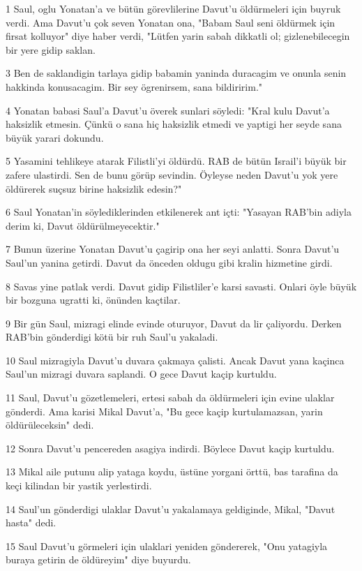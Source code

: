 \par 1 Saul, oglu Yonatan'a ve bütün görevlilerine Davut'u öldürmeleri için buyruk verdi. Ama Davut'u çok seven Yonatan ona, "Babam Saul seni öldürmek için firsat kolluyor" diye haber verdi, "Lütfen yarin sabah dikkatli ol; gizlenebilecegin bir yere gidip saklan.
\par 3 Ben de saklandigin tarlaya gidip babamin yaninda duracagim ve onunla senin hakkinda konusacagim. Bir sey ögrenirsem, sana bildiririm."
\par 4 Yonatan babasi Saul'a Davut'u överek sunlari söyledi: "Kral kulu Davut'a haksizlik etmesin. Çünkü o sana hiç haksizlik etmedi ve yaptigi her seyde sana büyük yarari dokundu.
\par 5 Yasamini tehlikeye atarak Filistli'yi öldürdü. RAB de bütün Israil'i büyük bir zafere ulastirdi. Sen de bunu görüp sevindin. Öyleyse neden Davut'u yok yere öldürerek suçsuz birine haksizlik edesin?"
\par 6 Saul Yonatan'in söylediklerinden etkilenerek ant içti: "Yasayan RAB'bin adiyla derim ki, Davut öldürülmeyecektir."
\par 7 Bunun üzerine Yonatan Davut'u çagirip ona her seyi anlatti. Sonra Davut'u Saul'un yanina getirdi. Davut da önceden oldugu gibi kralin hizmetine girdi.
\par 8 Savas yine patlak verdi. Davut gidip Filistliler'e karsi savasti. Onlari öyle büyük bir bozguna ugratti ki, önünden kaçtilar.
\par 9 Bir gün Saul, mizragi elinde evinde oturuyor, Davut da lir çaliyordu. Derken RAB'bin gönderdigi kötü bir ruh Saul'u yakaladi.
\par 10 Saul mizragiyla Davut'u duvara çakmaya çalisti. Ancak Davut yana kaçinca Saul'un mizragi duvara saplandi. O gece Davut kaçip kurtuldu.
\par 11 Saul, Davut'u gözetlemeleri, ertesi sabah da öldürmeleri için evine ulaklar gönderdi. Ama karisi Mikal Davut'a, "Bu gece kaçip kurtulamazsan, yarin öldürüleceksin" dedi.
\par 12 Sonra Davut'u pencereden asagiya indirdi. Böylece Davut kaçip kurtuldu.
\par 13 Mikal aile putunu alip yataga koydu, üstüne yorgani örttü, bas tarafina da keçi kilindan bir yastik yerlestirdi.
\par 14 Saul'un gönderdigi ulaklar Davut'u yakalamaya geldiginde, Mikal, "Davut hasta" dedi.
\par 15 Saul Davut'u görmeleri için ulaklari yeniden göndererek, "Onu yatagiyla buraya getirin de öldüreyim" diye buyurdu.
